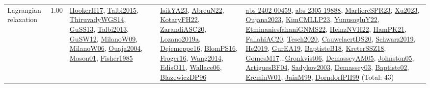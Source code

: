 {\begin{longtable}{p{3cm}r>{\raggedright\arraybackslash}p{6cm}>{\raggedright\arraybackslash}p{6cm}>{\raggedright\arraybackslash}p{8cm}}
\index{Lagrangian relaxation}\index{Algorithms!Lagrangian relaxation}Lagrangian relaxation &  1.00 & \hyperref[detail:HookerH17]{HookerH17}, \hyperref[detail:Talbi2015]{Talbi2015}, \hyperref[detail:ThiruvadyWGS14]{ThiruvadyWGS14}, \hyperref[detail:GuSS13]{GuSS13}, \hyperref[detail:Talbi2013]{Talbi2013}, \hyperref[detail:GuSW12]{GuSW12}, \hyperref[detail:MilanoW09]{MilanoW09}, \hyperref[detail:MilanoW06]{MilanoW06}, \hyperref[detail:Ouaja2004]{Ouaja2004}, \hyperref[detail:Mason01]{Mason01}, \hyperref[detail:Fisher1985]{Fisher1985} & \hyperref[detail:IsikYA23]{IsikYA23}, \hyperref[detail:AbreuN22]{AbreuN22}, \hyperref[detail:KotaryFH22]{KotaryFH22}, \hyperref[detail:ZarandiASC20]{ZarandiASC20}, \hyperref[detail:Lozano2019a]{Lozano2019a}, \hyperref[detail:Dejemeppe16]{Dejemeppe16}, \hyperref[detail:BlomPS16]{BlomPS16}, \hyperref[detail:Froger16]{Froger16}, \hyperref[detail:Wang2014]{Wang2014}, \hyperref[detail:EdisO11]{EdisO11}, \hyperref[detail:Wallace06]{Wallace06}, \hyperref[detail:BlazewiczDP96]{BlazewiczDP96} & \hyperref[detail:abs-2402-00459]{abs-2402-00459}, \hyperref[detail:abs-2305-19888]{abs-2305-19888}, \hyperref[detail:MarliereSPR23]{MarliereSPR23}, \hyperref[detail:Xu2023]{Xu2023}, \hyperref[detail:Oujana2023]{Oujana2023}, \hyperref[detail:KimCMLLP23]{KimCMLLP23}, \hyperref[detail:YunusogluY22]{YunusogluY22}, \hyperref[detail:EtminaniesfahaniGNMS22]{EtminaniesfahaniGNMS22}, \hyperref[detail:HeinzNVH22]{HeinzNVH22}, \hyperref[detail:HamPK21]{HamPK21}, \hyperref[detail:FallahiAC20]{FallahiAC20}, \hyperref[detail:Tesch2020]{Tesch2020}, \hyperref[detail:CauwelaertDS20]{CauwelaertDS20}, \hyperref[detail:Schwarz2019]{Schwarz2019}, \hyperref[detail:He2019]{He2019}, \hyperref[detail:GurEA19]{GurEA19}, \hyperref[detail:BaptisteB18]{BaptisteB18}, \hyperref[detail:KreterSSZ18]{KreterSSZ18}, \hyperref[detail:GomesM17]{GomesM17}...\hyperref[detail:Gronkvist06]{Gronkvist06}, \hyperref[detail:DemasseyAM05]{DemasseyAM05}, \hyperref[detail:Johnston05]{Johnston05}, \hyperref[detail:ArtiguesBF04]{ArtiguesBF04}, \hyperref[detail:Sadykov2003]{Sadykov2003}, \hyperref[detail:Demassey03]{Demassey03}, \hyperref[detail:Baptiste02]{Baptiste02}, \hyperref[detail:EreminW01]{EreminW01}, \hyperref[detail:JainM99]{JainM99}, \hyperref[detail:DorndorfPH99]{DorndorfPH99} (Total: 43)\\

\end{longtable}}
